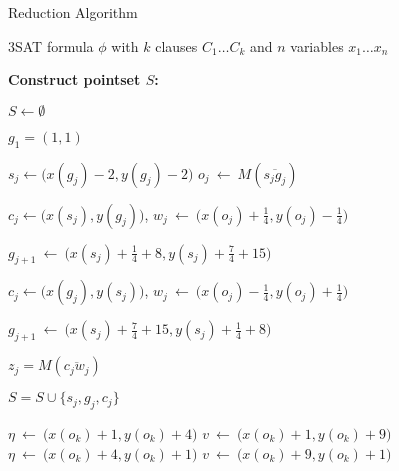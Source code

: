 \documentclass[12pt]{dalthesis}
\newcommand{\eq}{{\ \leftarrow\ }}
\newcommand{\pset}{S}
\newcommand{\gre}{{g}}
\newcommand{\sma}{{s}}
\newcommand{\Seg}[1]{{\overline{#1}}}
\begin{document}
\begin{algorithm} 
\caption {{\sc Reduction Algorithm}} 
\label{alg:reduction}
\begin{algorithmic}[1]
	\baselineskip
	\REQUIRE  3SAT formula $\phi$ with $k$ clauses $C_1 \dots C_k$ and $n$ variables $x_1 \dots x_n$
	

	\vspace{0.1in}
		
	\hspace{-0.2in} {\bf Construct pointset $S$:}  

	\STATE $\pset \leftarrow \emptyset$ \label{l:init}
	



 
	\STATE $\gre_1 = (1,1) $ \label{l:makeSStart}

	   \label{l:makeSLoop}

	\STATE $\sma_j \leftarrow \big(x(\gre_j)-2,y(\gre_j)-2\big) $
		 \STATE $o_j   \eq  M(\Seg{\sma_j\gre_j})$
	

	   
  
	\STATE $c_j \leftarrow \big(x(s_j), y(\gre_j) \big)$, $w_j  \eq \big(x(o_j)+\frac{1}{4},  y(o_j)-\frac{1}{4} \big)$

	\STATE  $\gre_{j+1} \eq \big (   x(s_{j}) + \frac{1}{4} + 8, y(s_{j}) + \frac{7}{4} +15 \big)$     		\label{l:ComputeNextEven}
    
		\ELSE
	\STATE $c_j \leftarrow \big(x(g_j), y(s_j) \big)$, $w_j  \eq \big(x(o_j)-\frac{1}{4},  y(o_j)+\frac{1}{4} \big)$ 
    
	\STATE  $\gre_{j+1} \eq \big ( x(s_{j}) + \frac{7}{4} + 15, y(s_{j}) + \frac{1}{4} + 8 \big)$     		\label{l:ComputeNextOdd}

  





	

	


	\ENDIF
	

  



\STATE $z_j = M(\Seg{c_jw_j})$

    \STATE $S = S \cup \{\sma_j,\gre_j, c_j\}$   \label{l:EndLoopPointSet}

	\ENDFOR






	  \label{l:ComputeV}
	  \STATE $\eta \eq \big( x(o_k)+1, y(o_k)+4\big)$  
      \STATE $v \eq \big( x(o_k)+1, y(o_k)+9\big)$  
		\ELSE
	   \STATE $\eta \eq \big( x(o_k)+4, y(o_k)+1\big)$  
      \STATE $v \eq \big( x(o_k)+9, y(o_k)+1\big)$  
	\ENDIF


\end{algorithmic}
\end{algorithm}
\end{document}
